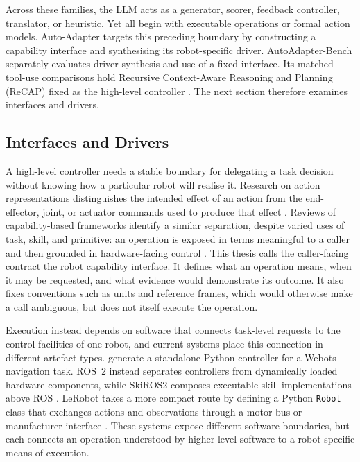 Across these families, the LLM acts as a generator, scorer, feedback
controller, translator, or heuristic. Yet all begin with executable operations
or formal action models. Auto-Adapter targets this preceding boundary by
constructing a capability interface and synthesising its robot-specific
driver. AutoAdapter-Bench separately evaluates driver synthesis and use of a fixed
interface. Its matched tool-use comparisons hold Recursive Context-Aware
Reasoning and Planning (ReCAP) fixed as the high-level controller
\citep{zhang2025recap}. The next section therefore examines interfaces and
drivers.

\subsection{Interfaces and Drivers}
\label{sec:interfaces-drivers}

A high-level controller needs a stable boundary for delegating a task decision
without knowing how a particular robot will realise it. Research on action
representations distinguishes the intended effect of an action from the
end-effector, joint, or actuator commands used to produce that effect
\citep{zech2019action}. Reviews of capability-based frameworks identify a
similar separation, despite varied uses of task, skill, and primitive: an
operation is exposed in terms meaningful to a caller and then grounded in
hardware-facing control \citep{pantano2022capabilitysurvey}. This thesis calls
the caller-facing contract the robot capability interface. It defines what an
operation means, when it may be requested, and what evidence would demonstrate
its outcome. It also fixes conventions such as units and reference frames,
which would otherwise make a call ambiguous, but does not itself execute the
operation.

Execution instead depends on software that connects task-level requests to
the control facilities of one robot, and current systems place this connection
in different artefact types. \citet{tripathi2026testdriven} generate a standalone Python
controller for a Webots navigation task. ROS~2 instead separates controllers
from dynamically loaded hardware components, while SkiROS2 composes executable
skill implementations above ROS
\citep{macenski2022ros2,ros2control2026hardware,mayr2023skiros2}.
LeRobot takes a more compact route by defining a Python \texttt{Robot} class
that exchanges actions and observations through a motor bus or manufacturer
interface \citep{lerobot2026hardware}. These systems expose different software
boundaries, but each connects an operation understood by higher-level software
to a robot-specific means of execution.

